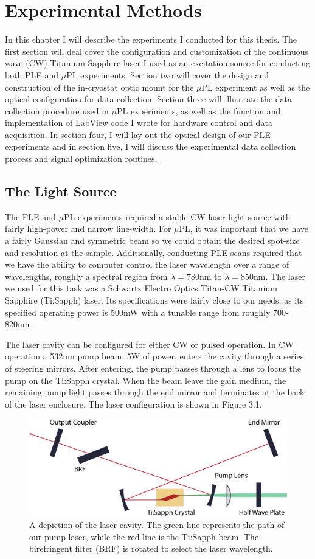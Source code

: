 \chapter{Experimental Methods}
In this chapter I will describe the experiments I conducted for this thesis. The first section will deal cover the configuration and customization of the continuous wave (CW) Titanium Sapphire laser I used as an excitation source for conducting both PLE and $\mu$PL experiments. Section two will cover the design and construction of the in-cryostat optic mount for the $\mu$PL experiment as well as the optical configuration for data collection. Section three will illustrate the data collection procedure used in $\mu$PL experiments, as well as the function and implementation of LabView code I wrote for hardware control and data acquisition. In section four, I will lay out the optical design of our PLE experiments and in section five, I will discuss the experimental data collection process and signal optimization routines.

\section{The Light Source}
\indent The PLE and $\mu$PL experiments required a stable CW laser light source with fairly high-power and narrow line-width. For $\mu$PL, it was important that we have a fairly Gaussian and symmetric beam so we could obtain the desired spot-size and resolution at the sample. Additionally, conducting PLE scans required that we have the ability to computer control the laser wavelength over a range of wavelengths, roughly a spectral region from $\lambda = 780$nm to $\lambda = 850$nm. The laser we used for this task was a Schwartz Electro Optics Titan-CW Titanium Sapphire (Ti:Sapph) laser. Its specifications were fairly close to our needs, as its specified operating power is 500mW with a tunable range from roughly 700-820nm \cite{SEO}. 

\indent The laser cavity can be configured for either CW or pulsed operation. In CW operation a 532nm pump beam, 5W of power, enters the cavity through a series of steering mirrors. After entering, the pump passes through a lens to focus the pump on the Ti:Sapph crystal. When the beam leave the gain medium, the remaining pump light passes through the end mirror and terminates at the back of the laser enclosure. The laser configuration is shown in Figure 3.1.
\begin{figure}[h!]
\centering
\includegraphics[width = .8\textwidth]{laser.png}
\caption{ \doublespacing A depiction of the laser cavity. The green line represents the path of our pump laser, while the red line is the Ti:Sapph beam. The birefringent filter (BRF) is rotated to select the laser wavelength.}
\label{lasercav}
\end{figure}

